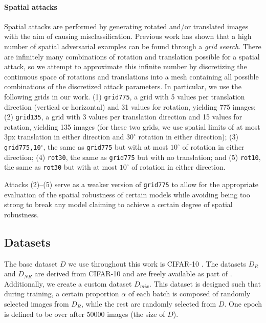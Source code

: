 \paragraph{Spatial attacks} Spatial attacks are performed by generating rotated and/or translated images with the aim of causing misclassification. Previous work \cite{Engstrom17} has shown that a high number of spatial adversarial examples can be found through a \textit{grid search}. There are infinitely many combinations of rotation and translation possible for a spatial attack, so we attempt to approximate this infinite number by discretizing the continuous space of rotations and translations into a mesh containing all possible combinations of the discretized attack parameters. In particular, we use the following grids in our work. (1) \texttt{grid775}, a grid with 5 values per translation direction (vertical or horizontal) and 31 values for rotation, yielding 775 images; (2) \texttt{grid135}, a grid with 3 values per translation direction and 15 values for rotation, yielding 135 images (for these two grids, we use spatial limits of at most 3px translation in either direction and $30^\circ$ rotation in either direction); (3) \texttt{grid775,10$^\circ$}, the same as \texttt{grid775} but with at most $10^\circ$ of rotation in either direction; (4) \texttt{rot30}, the same as \texttt{grid775} but with no translation; and (5) \texttt{rot10}, the same as \texttt{rot30} but with at most $10^\circ$ of rotation in either direction. 

Attacks (2)--(5) serve as a weaker version of \texttt{grid775} to allow for the appropriate evaluation of the spatial robustness of certain models while avoiding being too strong to break any model claiming to achieve a certain degree of spatial robustness.

\subsection{Datasets}

The base dataset $D$ we use throughout this work is CIFAR-10 \cite{Krizhevsky09}. The datasets $D_R$ and $D_{NR}$ are derived from CIFAR-10 and are freely available as part of \cite{Ilyas2019}. Additionally, we create a custom dataset $D_{mix}$. This dataset is designed such that during training, a certain proportion $\alpha$ of each batch is composed of randomly selected images from $D_R$, while the rest are randomly selected from $D$. One epoch is defined to be over after 50000 images (the size of $D$).

